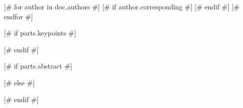 \documentclass[draft]{agujournal2019}
[# else #]
\begin{document}

[# for author in doc.authors #]
[# if author.corresponding #]
[# endif #]
[# endfor #]




[# if parts.keypoints #]
\begin{keypoints}
\item [-keypoint-]
[# endfor #]
\end{keypoints}
[# endif #]

%
%

%
%


[# if parts.abstract #]
\begin{abstract}
[-parts.abstract-]
\end{abstract}
[# else #]
\begin{abstract}
  Your abstract here!
\end{abstract}
[# endif #]
\end{document}
